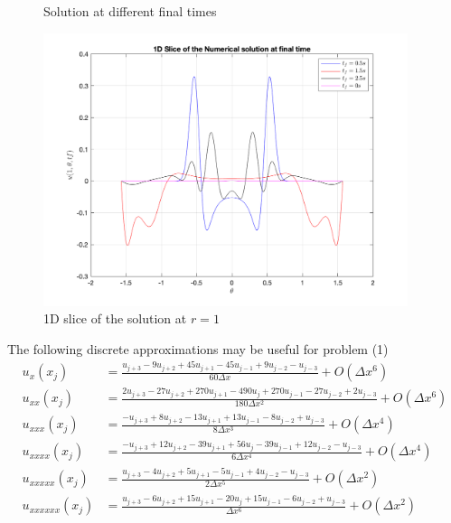 \documentclass[11pt]{article}
\begin{document}
\begin{enumerate}
\begin{enumerate}
\begin{figure}[htp]
\begin{tabular}{cc}
      \end{tabular}
      \caption{Solution at different final times}
      \label{fig:Q2_plots}
      \end{figure}
      \begin{figure}[htp]
      \centering
      \includegraphics[width=4.2in]{Q2_1Dslice.png}
      \caption{1D slice of the solution at $r=1$}
      \label{fig:Q2_1D}
      \end{figure}
    \end{enumerate}
\end{enumerate}

\vspace{1in}
The following discrete approximations may be useful for problem (1)
\begin{align*}
  u_x(x_j) & = \frac{u_{j+3}-9u_{j+2}+45u_{j+1}-45u_{j-1}+9u_{j-2}-u_{j-3}}{60\Delta x} +O(\Delta x^6)\\
  u_{xx}(x_j) & = \frac{2u_{j+3}-27u_{j+2}+270u_{j+1}-490u_j+270u_{j-1}-27u_{j-2}+2u_{j-3}}{180\Delta x^2} +O(\Delta x^6)\\
  u_{xxx}(x_j) & = \frac{-u_{j+3}+8u_{j+2}-13u_{j+1}+13u_{j-1}-8u_{j-2}+u_{j-3}}{8\Delta x^3} +O(\Delta x^4)\\
  u_{xxxx}(x_j) & = \frac{-u_{j+3}+12u_{j+2}-39u_{j+1}+56u_j-39u_{j-1}+12u_{j-2}-u_{j-3}}{6\Delta x^4} +O(\Delta x^4)\\
  u_{xxxxx}(x_j) & = \frac{u_{j+3}-4u_{j+2}+5u_{j+1}-5u_{j-1}+4u_{j-2}-u_{j-3}}{2\Delta x^5} +O(\Delta x^2)\\
  u_{xxxxxx}(x_j) & = \frac{u_{j+3}-6u_{j+2}+15u_{j+1}-20u_j+15u_{j-1}-6u_{j-2}+u_{j-3}}{\Delta x^6} +O(\Delta x^2)\\
\end{align*}
\end{document}
